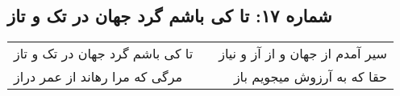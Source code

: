 \begin{center}
\section*{شماره ۱۷: تا کی باشم گرد جهان در تک و تاز}
\label{sec:017}
\begin{longtable}{l p{0.5cm} r}
تا کی باشم گرد جهان در تک و تاز
&&
سیر آمدم از جهان و از آز و نیاز
\\
مرگی که مرا رهاند از عمر دراز
&&
حقا که به آرزوش میجویم باز
\\
\end{longtable}
\end{center}
